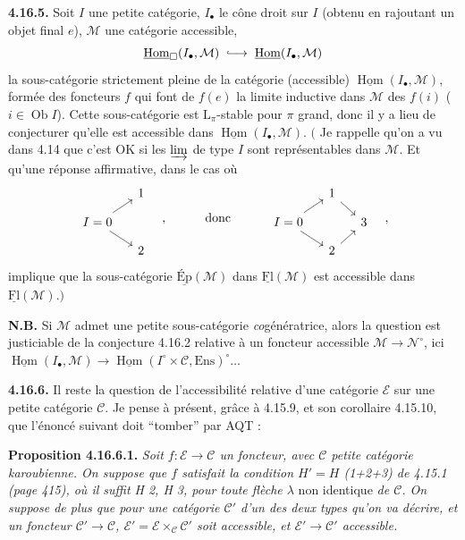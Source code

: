 \documentclass[11pt]{article}
\newcommand{\printedpage}[1]{\marginpar{\footnotesize p.~#1}}
\newcommand{\msp}[1]{\marginpar{\footnotesize [#1]}}
\newcommand{\Hom}{\operatorname{Hom}}
\newcommand{\Ob}{\operatorname{Ob}}
\newcommand{\Ens}{\mathrm{Ens}}
\newcommand{\into}{\lhook\joinrel\longrightarrow}
\begin{document}
\textbf{4.16.5.} Soit $I$ une petite catégorie, $I_\bullet$ le cône droit sur $I$ (obtenu en rajoutant un objet final $e$), $\mathcal{M}$ une catégorie accessible,
\[
\underline{\Hom}_{\square}(I_\bullet,\mathcal{M}) \;\into\; \underline{\Hom}(I_\bullet,\mathcal{M})
\]
la sous-catégorie strictement pleine de la catégorie (accessible) $\underline{\Hom}(I_\bullet,\mathcal{M})$, formée des foncteurs $f$ qui font de $f(e)$ la limite inductive dans $\mathcal{M}$ des $f(i)$ ($i \in \Ob I$). Cette sous-catégorie est $\mathrm{L}_\pi$-stable pour $\pi$ grand, donc il y a lieu
\msp{473}
de conjecturer qu'elle est accessible dans $\underline{\Hom}(I_\bullet,\mathcal{M})$. $\Big($ Je rappelle qu'on a vu dans 4.14 que c'est OK si les $\varinjlim$ de type $I$ sont représentables dans $\mathcal{M}$. Et qu'une réponse affirmative, dans le cas où
\printedpage{183}
\[
\begin{tikzcd}[row sep=small, column sep=small]
 & 1 \\
I = 0 \arrow[ur] \arrow[dr] & \\
 & 2
\end{tikzcd}
\quad ,\qquad\quad \text{donc} \qquad\quad
\begin{tikzcd}[row sep=small, column sep=small]
 & 1 \arrow[dr] & \\
I = 0 \arrow[ur] \arrow[dr] & & 3 \\
 & 2 \arrow[ur] &
\end{tikzcd}
\quad ,
\]
implique que la sous-catégorie $\underline{\text{Ép}}(\mathcal{M})$ dans $\underline{\mathrm{Fl}}(\mathcal{M})$ est accessible dans $\underline{\mathrm{Fl}}(\mathcal{M})$.$\Big)$

\textbf{N.B.} Si $\mathcal{M}$ admet une petite sous-catégorie \textit{co}génératrice, alors la question est justiciable de la conjecture 4.16.2 relative à un foncteur accessible $\mathcal{M} \longrightarrow \mathcal{N}^\circ$, ici $\underline{\Hom}(I_\bullet,\mathcal{M}) \longrightarrow \underline{\Hom}(I^\circ \times \mathcal{C},\Ens)^\circ \dots$

\textbf{4.16.6.} Il reste la question de l'accessibilité relative d'une catégorie $\mathcal{E}$ sur une petite catégorie $\mathcal{C}$. Je pense à présent, grâce à 4.15.9, et son corollaire 4.15.10, que l'énoncé suivant doit “tomber” par AQT :

\textbf{Proposition 4.16.6.1.} \textit{Soit $f : \mathcal{E} \longrightarrow \mathcal{C}$ un foncteur, avec $\mathcal{C}$ petite catégorie karoubienne. On suppose que $f$ satisfait la condition $H' = H$ (1+2+3) de 4.15.1 (page 415), où il suffit H 2, H 3, pour toute flèche $\lambda$} non identique \textit{de $\mathcal{C}$. On suppose de plus que pour une catégorie $\mathcal{C}'$ d'un des deux types qu'on va décrire, et un foncteur $\mathcal{C}' \longrightarrow \mathcal{C}$, $\mathcal{E}' = \mathcal{E} \times_{\mathcal{C}} \mathcal{C}'$ soit accessible, et $\mathcal{E}' \longrightarrow \mathcal{C}'$ accessible.}
\end{document}
